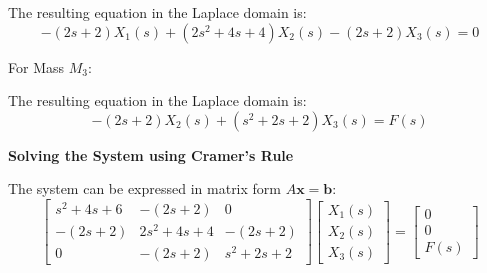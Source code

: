 ﻿\documentclass[11pt]{article}
\begin{document}
The resulting equation in the Laplace domain is:
\begin{equation}
-(2s + 2)X_1(s) + (2s^2 + 4s + 4)X_2(s) - (2s + 2)X_3(s) = 0 \tag{2}
\end{equation}

\newpage

\vspace{12pt}
{For Mass $M_3$:}
\begin{figure}[h!]
\centering
{}
\end{figure}

The resulting equation in the Laplace domain is:
\begin{equation}
-(2s + 2)X_2(s) + (s^2 + 2s + 2)X_3(s) = F(s) \tag{3}
\end{equation}

\noindent\textbf{Solving the System using Cramer's Rule}
\vspace{12pt}

The system can be expressed in matrix form $A\mathbf{x} = \mathbf{b}$:
$$
\begin{bmatrix}
s^2 + 4s + 6 & -(2s + 2) & 0 \\
-(2s + 2) & 2s^2 + 4s + 4 & -(2s + 2) \\
0 & -(2s + 2) & s^2 + 2s + 2
\end{bmatrix}
\begin{bmatrix}
X_1(s) \\
X_2(s) \\
X_3(s)
\end{bmatrix}
=
\begin{bmatrix}
0 \\
0 \\
F(s)
\end{bmatrix}
$$
\end{document}

